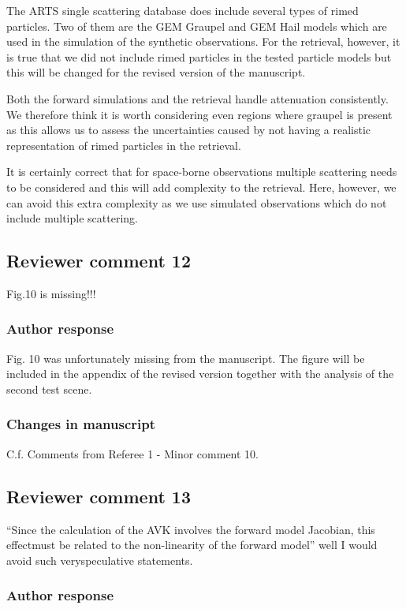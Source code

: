 The ARTS single scattering database does include several types of rimed
particles. Two of them are the GEM Graupel and GEM Hail models which are used in
the simulation of the synthetic observations. For the retrieval, however, it is
true that we did not include rimed particles in the tested particle models but this
will be changed for the revised version of the manuscript.

Both the forward simulations and the retrieval handle attenuation consistently.
We therefore think it is worth considering even regions where graupel is present
as this allows us to assess the uncertainties caused by not having a realistic
representation of rimed particles in the retrieval.

It is certainly correct that for space-borne observations multiple scattering
needs to be considered and this will add complexity to the retrieval. Here,
however, we can avoid this extra complexity as we use simulated observations
which do not include multiple scattering.

\subsection*{Reviewer comment 12}

Fig.10 is missing!!!

\subsubsection*{Author response}

Fig. 10 was unfortunately missing from the manuscript. The figure will be included in the appendix
of the revised version together with the analysis of the second test scene.

\subsubsection*{Changes in manuscript}

C.f. Comments from Referee 1 - Minor comment 10.

\subsection*{Reviewer comment 13}
 “Since the calculation of the AVK involves the forward model Jacobian, this effectmust be related to the non-linearity of the forward model” well I would avoid such veryspeculative statements.

\subsubsection*{Author response}

